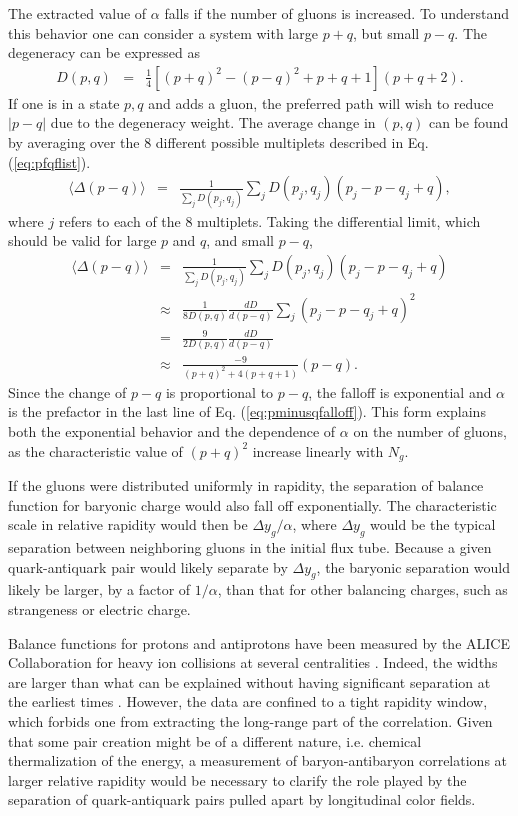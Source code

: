 \documentclass[aps, prc, 12pt, nofootinbib, showpacs, superscriptaddress, tightenlines, groupedaddress]{revtex4-2}
\begin{document}
The extracted value of $\alpha$ falls if the number of gluons is increased. To understand this behavior one can consider a system with large $p+q$, but small $p-q$. The degeneracy can be expressed as
\begin{eqnarray}
D(p,q)&=&\frac{1}{4}\left[(p+q)^2-(p-q)^2+p+q+1\right](p+q+2).
\end{eqnarray}
If one is in a state $p,q$ and adds a gluon, the preferred path will wish to reduce $|p-q|$ due to the degeneracy weight. The average change in $(p,q)$ can be found by averaging over the 8 different possible multiplets described in Eq. (\ref{eq:pfqflist}). 
\begin{eqnarray}
\langle \Delta(p-q)\rangle &=&\frac{1}{\sum_jD(p_j,q_j)}\sum_jD(p_j,q_j)(p_j-p-q_j+q),
\end{eqnarray}
where $j$ refers to each of the 8 multiplets. Taking the differential limit, which should be valid for large $p$ and $q$, and small $p-q$, 
\begin{eqnarray}\label{eq:pminusqfalloff}
\langle \Delta(p-q)\rangle &=&\frac{1}{\sum_jD(p_j,q_j)}\sum_jD(p_j,q_j)(p_j-p-q_j+q)\\
\nonumber
&\approx&\frac{1}{8D(p,q)}\frac{dD}{d(p-q)}\sum_j (p_j-p-q_j+q)^2\\
\nonumber
&=&\frac{9}{2D(p,q)}\frac{dD}{d(p-q)}\\
\nonumber
&\approx&\frac{-9}{(p+q)^2+4(p+q+1)}(p-q).
\end{eqnarray}
Since the change of $p-q$ is proportional to $p-q$, the falloff is exponential and $\alpha$ is the prefactor in the last line of Eq. (\ref{eq:pminusqfalloff}). This form explains both the exponential behavior and the dependence of $\alpha$ on the number of gluons, as the characteristic value of $(p+q)^2$ increase linearly with $N_g$.

If the gluons were distributed uniformly in rapidity, the separation of balance function for baryonic charge would also fall off exponentially. The characteristic scale in relative rapidity would then be $\Delta y_g/\alpha$, where $\Delta y_g$ would be the typical separation between neighboring gluons in the initial flux tube. Because a given quark-antiquark pair would likely separate by $\Delta y_g$, the baryonic separation would likely be larger, by a factor of $1/\alpha$, than that for other balancing charges, such as strangeness or electric charge.

Balance functions for protons and antiprotons have been measured by the ALICE Collaboration for heavy ion collisions at several centralities \cite{ALICE:2021hjb}. Indeed, the widths are larger than what can be explained without having significant separation at the earliest times \cite{Pratt:2021xvg}. However, the data are confined to a tight rapidity window, which forbids one from extracting the long-range part of the correlation. Given that some pair creation might be of a different nature, i.e. chemical thermalization of the energy, a measurement of baryon-antibaryon correlations at larger relative rapidity would be necessary to clarify the role played by the separation of quark-antiquark pairs pulled apart by longitudinal color fields. 
\end{document}
